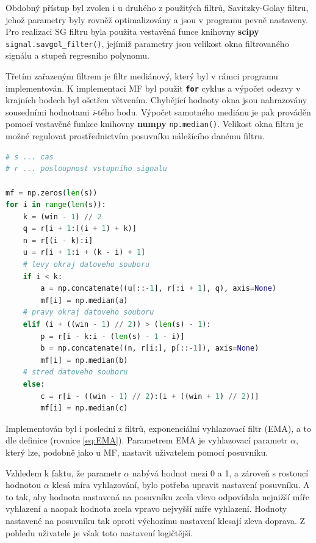 \documentclass[a4paper, 12pt]{article}
\begin{document}
Obdobný přístup byl zvolen i u druhého z použitých filtrů, Savitzky-Golay filtru, jehož parametry byly rovněž optimalizovány a jsou v programu pevně nastaveny. Pro realizaci SG filtru byla použita vestavěná funce knihovny \textbf{scipy} \texttt{signal.savgol}\verb|_|\texttt{filter()}, jejímiž parametry jsou velikost okna filtrovaného signálu a stupeň regresního polynomu.

Třetím zařazeným filtrem je filtr mediánový, který byl v rámci programu implementován. K implementaci MF byl použit \textbf{\texttt{\textcolor{royalblue(traditional)}{for}}} cyklus a výpočet odezvy v krajních bodech byl ošetřen větvením. Chybějící hodnoty okna jsou nahrazovány sousedními hodnotami \textit{i}-tého bodu. Výpočet samotného mediánu je pak prováděn pomocí vestavěné funkce knihovny \textbf{numpy} \texttt{np.median()}. Velikost okna filtru je možné regulovat prostřednictvím posuvníku náležícího danému filtru. 
\vskip 0.2in
\begin{lstlisting}[language=Python,numbers=none,frame=single]
# s ... cas
# r ... posloupnost vstupniho signalu

mf = np.zeros(len(s))
for i in range(len(s)):
    k = (win - 1) // 2
    q = r[i + 1:((i + 1) + k)]
    n = r[(i - k):i]
    u = r[i + 1:i + (k - i) + 1]
    # levy okraj datoveho souboru
    if i < k:
        a = np.concatenate((u[::-1], r[:i + 1], q), axis=None)
        mf[i] = np.median(a)
    # pravy okraj datoveho souboru
    elif (i + ((win - 1) // 2)) > (len(s) - 1):
        p = r[i - k:i - (len(s) - 1 - i)]
        b = np.concatenate((n, r[i:], p[::-1]), axis=None)
        mf[i] = np.median(b)
    # stred datoveho souboru
    else:
        c = r[i - ((win - 1) // 2):(i + ((win + 1) // 2))]
        mf[i] = np.median(c)
\end{lstlisting}
\vskip 0.2in
Implementován byl i poslední z filtrů, exponenciální vyhlazovací filtr (EMA), a to dle definice (rovnice \ref{eq:EMA}). Parametrem EMA je vyhlazovací parametr $\alpha$, který lze, podobně jako u MF, nastavit uživatelem pomocí posuvníku. \par
Vzhledem k faktu, že parametr $\alpha$ nabývá hodnot mezi 0 a 1, a zároveň s rostoucí hodnotou $\alpha$ klesá míra vyhlazování, bylo potřeba upravit nastavení posuvníku. A to tak, aby hodnota nastavená na posuvníku zcela vlevo odpovídala nejnižší míře vyhlazení a naopak hodnota zcela vpravo nejvyšší míře vyhlazení. Hodnoty nastavené na posuvníku tak oproti výchozímu nastavení klesají zleva doprava. Z pohledu uživatele je však toto nastavení logičtější.
\end{document}
